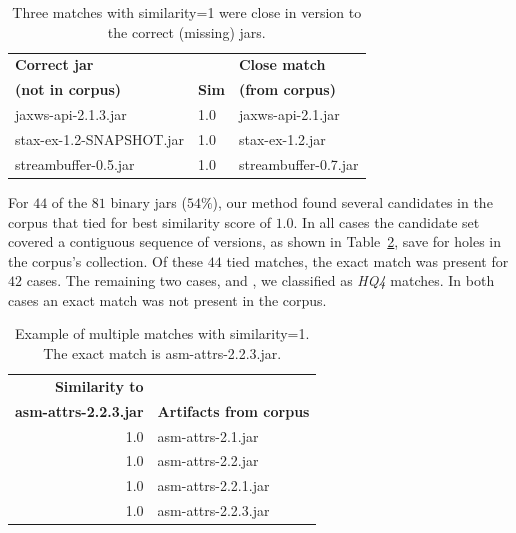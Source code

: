\begin{table}[htbp]
  \centering
  \begin{tabular}{lll}
    \textbf{Correct jar}      &                & \textbf{Close match} \\
    \textbf{(not in corpus)}  & \textbf{Sim}  & \textbf{(from corpus)} \\
\hline\hline
                      jaxws-api-2.1.3.jar & 1.0 & jaxws-api-2.1.jar       \\
                 stax-ex-1.2-SNAPSHOT.jar & 1.0 & stax-ex-1.2.jar         \\
                     streambuffer-0.5.jar & 1.0 & streambuffer-0.7.jar    \\
\hline
  \end{tabular}
  \vspace{1mm}
  \caption{Three matches with similarity=1 were close in version to the correct (missing) jars.}
  \label{tab:close}
\end{table}




For $44$ of the $81$ binary jars ($54\%$), our method found several
candidates in the corpus that tied for best similarity score of $1.0$.  In
all cases the candidate set covered a contiguous sequence of versions, as
shown in Table~\ref{tab:contiguous}, save for holes in the corpus's
collection.  Of these $44$ tied matches, the exact match was present for
$42$ cases.  The remaining two cases,  and
, we classified as \emph{HQ4}
matches.  In both cases an exact match was not present in the corpus.

\begin{table}[htbp]
  \centering
  \begin{tabular}{rl}
    \textbf{Similarity to}  & \\
    \textbf{asm-attrs-2.2.3.jar}  &  \textbf{Artifacts from corpus}\\
\hline\hline
                 1.0 & asm-attrs-2.1.jar    \\
                 1.0 & asm-attrs-2.2.jar    \\
                 1.0 & asm-attrs-2.2.1.jar  \\
                 1.0 & asm-attrs-2.2.3.jar  \\
\hline
  \end{tabular}
  \vspace{1mm}
  \caption{Example of multiple matches with similarity=1.  The
    exact match is asm-attrs-2.2.3.jar.}
  \label{tab:contiguous}
\end{table}

